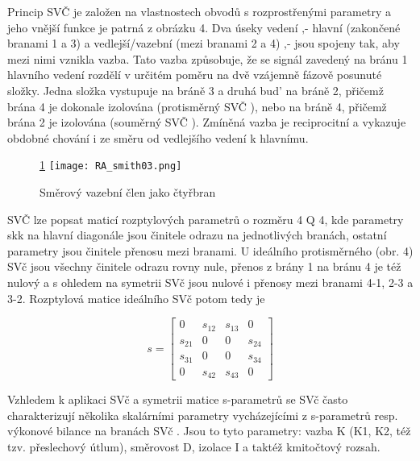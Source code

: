         Princip SVČ je založen na vlastnostech obvodů s rozprostřenými parametry a jeho vnější 
        funkce je patrná z obrázku 4. Dva úseky vedení ‚- hlavní (zakončené branami 1 a 3) a 
        vedlejší/vazební (mezi branami 2 a 4) ‚- jsou spojeny tak, aby mezi nimi vznikla vazba. 
        Tato vazba způsobuje, že se signál zavedený na bránu 1 hlavního vedení rozdělí v určitém 
        poměru na dvě vzájemně fázově posunuté složky. Jedna složka vystupuje na bráně 3 a druhá 
        bud’ na bráně 2, přičemž brána 4 je dokonale izolována (protisměrný SVČ ), nebo na bráně 4, 
        přičemž brána 2 je izolována (souměrný SVČ ). Zmíněná vazba je reciprocitní a vykazuje 
        obdobné chování i ze směru od vedlejšího vedení k hlavnímu.      
  
        \begin{figure}\ref{fyz:fig_RA_smith03} 
          \centering
          \texttt{[image: RA\_smith03.png]}
          \caption{Směrový vazební člen jako čtyřbran}
          \label{fyz:fig_RA_smith03} 
        \end{figure}
  
        SVČ lze popsat maticí rozptylových parametrů o rozměru 4 Q 4, kde parametry skk na hlavní 
        diagonále jsou činitele odrazu na jednotlivých branách, ostatní parametry jsou činitele 
        přenosu mezi branami. U ideálního protisměrného (obr. 4) SVč jsou všechny činitele odrazu 
        rovny nule, přenos z brány 1 na bránu 4 je též nulový a s ohledem na symetrii SVč jsou 
        nulové i přenosy mezi branami 4-1, 2-3 a 3-2. Rozptylová matice ideálního SVč potom tedy je
  
        \begin{equation}\label{RA:eq_smith09}
          s = \left[
            \begin{matrix}
                0    & s_{12} & s_{13} &  0       \\
              s_{21} &   0    &   0    & s_{24}   \\
              s_{31} &   0    &   0    & s_{34}   \\
                0    & s_{42} & s_{43} &  0     
            \end{matrix}
              \right]
        \end{equation} 
  
        Vzhledem k aplikaci SVč a symetrii matice s-parametrů se SVč často charakterizují několika 
        skalárními parametry vycházejícími z s-parametrů resp. výkonové bilance na branách SVč . 
        Jsou to tyto parametry: vazba K (K1, K2, též tzv. přeslechový útlum), směrovost D, izolace 
        I a taktéž kmitočtový rozsah.
  
